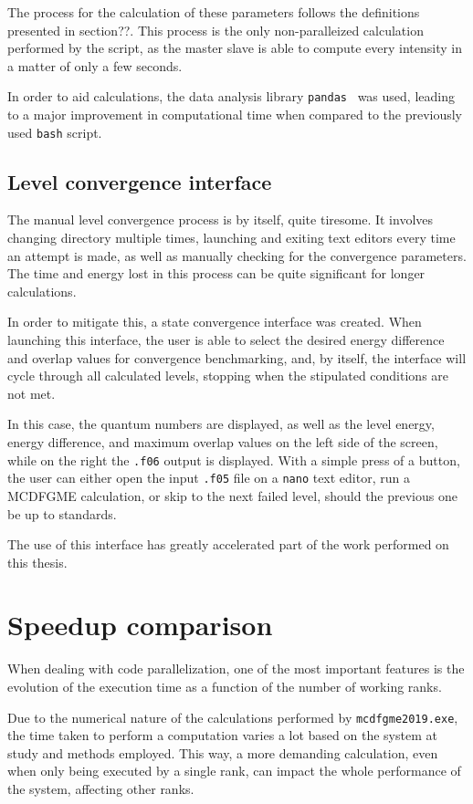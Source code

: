 The process for the calculation of these parameters follows the definitions presented in section??. This process is the only non-paralleized calculation performed by the script, as the master slave is able to compute every intensity in a matter of only a few seconds.

In order to aid calculations, the data analysis library \verb|pandas|~\cite{reback2020pandas} was used, leading to a major improvement in computational time when compared to the previously used \verb|bash| script.

\subsection{Level convergence interface}

The manual level convergence process is by itself, quite tiresome. It involves changing directory multiple times, launching and exiting text editors every time an attempt is made, as well as manually checking for the convergence parameters. The time and energy lost in this process can be quite significant for longer calculations.

In order to mitigate this, a state convergence interface was created. When launching this interface, the user is able to select the desired energy difference and overlap values for convergence benchmarking, and, by itself, the interface will cycle through all calculated levels, stopping when the stipulated conditions are not met.

In this case, the quantum numbers are displayed, as well as the level energy, energy difference, and maximum overlap values on the left side of the screen, while on the right the \verb|.f06| output is displayed. With a simple press of a button, the user can either open the input \verb|.f05| file on a \verb|nano| text editor, run a \gls{MCDFGME} calculation, or skip to the next failed level, should the previous one be up to standards.

The use of this interface has greatly  accelerated part of the work performed on this thesis.
\section{Speedup comparison}

When dealing with code parallelization, one of the most important features is the evolution of the execution time as a function of the number of working ranks.

Due to the numerical nature of the calculations performed by \verb|mcdfgme2019.exe|, the time taken to perform a computation varies a lot based on the system at study and methods employed. This way, a more demanding calculation, even when only being executed by a single rank, can impact the whole performance of the system, affecting other ranks.

